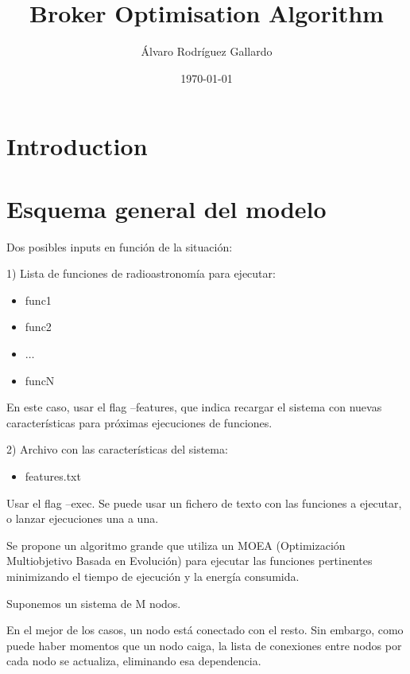 \documentclass{article}
\title{Broker Optimisation Algorithm}
\author{Álvaro Rodríguez Gallardo}
\date{\today}
\begin{document}
\maketitle

\section{Introduction}

\section{Esquema general del modelo}

Dos posibles inputs en función de la situación:

1) Lista de funciones de radioastronomía para ejecutar:

\begin{itemize} %
  \item[] \hspace{1cm}func1
  \item[] \hspace{1cm}func2
  \item[] \hspace{1cm}$\ldots$
  \item[] \hspace{1cm}funcN
\end{itemize} %

En este caso, usar el flag --features, que indica recargar el sistema con nuevas características para próximas ejecuciones de funciones.

2) Archivo con las características del sistema:

\begin{itemize}
	\item[] \hspace{1cm}features.txt
\end{itemize}

Usar el flag --exec. Se puede usar un fichero de texto con las funciones a ejecutar, o lanzar ejecuciones una a una.

Se propone un algoritmo grande que utiliza un MOEA (Optimización Multiobjetivo Basada en Evolución) para ejecutar las funciones pertinentes minimizando el tiempo de ejecución y la energía consumida.

Suponemos un sistema de M nodos.

En el mejor de los casos, un nodo está conectado con el resto. Sin embargo, como puede haber momentos que un nodo caiga, la lista de conexiones entre nodos por cada nodo se actualiza, eliminando esa dependencia.
\end{document}
